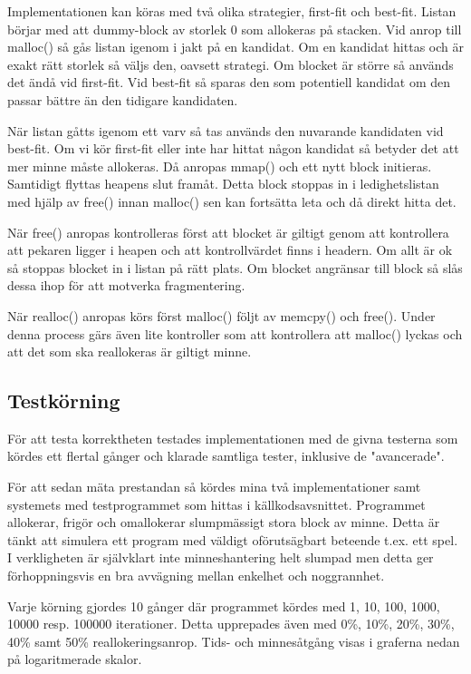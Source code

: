 \documentclass[10pt,a4paper]{article}
\begin{document}
Implementationen kan köras med två olika strategier, first-fit och best-fit. Listan börjar med att dummy-block av storlek 0 som allokeras på stacken. Vid anrop till malloc() så gås listan igenom i jakt på en kandidat. Om en kandidat hittas och är exakt rätt storlek så väljs den, oavsett strategi. Om blocket är större så används det ändå vid first-fit. Vid best-fit så sparas den som potentiell kandidat om den passar bättre än den tidigare kandidaten.

När listan gåtts igenom ett varv så tas används den nuvarande kandidaten vid best-fit. Om vi kör first-fit eller inte har hittat någon kandidat så betyder det att mer minne måste allokeras. Då anropas mmap() och ett nytt block initieras. Samtidigt flyttas heapens slut framåt. Detta block stoppas in i ledighetslistan med hjälp av free() innan malloc() sen kan fortsätta leta och då direkt hitta det.

När free() anropas kontrolleras först att blocket är giltigt genom att kontrollera att pekaren ligger i heapen och att kontrollvärdet finns i headern. Om allt är ok så stoppas blocket in i listan på rätt plats. Om blocket angränsar till block så slås dessa ihop för att motverka fragmentering.

När realloc() anropas körs först malloc() följt av memcpy() och free(). Under denna process gärs även lite kontroller som att kontrollera att malloc() lyckas och att det som ska reallokeras är giltigt minne.

\clearpage
\subsection{Testkörning}

För att testa korrektheten testades implementationen med de givna testerna som kördes ett flertal gånger och klarade samtliga tester, inklusive de "avancerade".

För att sedan mäta prestandan så kördes mina två implementationer samt systemets med testprogrammet som hittas i källkodsavsnittet. Programmet allokerar, frigör och omallokerar slumpmässigt stora block av minne. Detta är tänkt att simulera ett program med väldigt oförutsägbart beteende t.ex. ett spel. I verkligheten är självklart inte minneshantering helt slumpad men detta ger förhoppningsvis en bra avvägning mellan enkelhet och noggrannhet.

Varje körning gjordes 10 gånger där programmet kördes med 1, 10, 100, 1000, 10000 resp. 100000 iterationer. Detta upprepades även med 0\%, 10\%, 20\%, 30\%, 40\% samt 50\% reallokeringsanrop. Tids- och minnesåtgång visas i graferna nedan på logaritmerade skalor.
\end{document}
